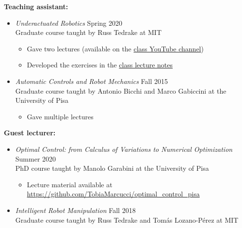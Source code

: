 \documentclass[11pt,a4paper,sans]{moderncv}
\begin{document}
\textbf{Teaching assistant:}

\vspace{5pt}

\begin{itemize}

\item \textit{Underactuated  Robotics} \hfill Spring 2020 \\
Graduate course taught by Russ Tedrake at MIT
\begin{itemize}
\item
Gave two lectures (available on the  \href{https://www.youtube.com/playlist?list=PLkx8KyIQkMfX1WpWYqtep7TOmboZeDtev}{\color{cyan}class YouTube channel})
\item
Developed the exercises in the \href{http://underactuated.csail.mit.edu}{\color{cyan}class lecture notes}
\end{itemize}

\item \textit{Automatic Controls and Robot Mechanics} \hfill Fall 2015 \\
Graduate course taught by Antonio Bicchi and Marco Gabiccini at the University of Pisa
\begin{itemize}
\item
Gave multiple lectures
\end{itemize}

\end{itemize}

\vspace{5pt}

\textbf{Guest lecturer:}

\vspace{5pt}

\begin{itemize}

\item \textit{Optimal Control: from Calculus of Variations to Numerical Optimization} \hfill Summer 2020 \\
PhD course taught by Manolo Garabini at the University of Pisa
\begin{itemize}
\item
Lecture material available at \href{https://github.com/TobiaMarcucci/optimal_control_pisa}{\color{cyan}https://github.com/TobiaMarcucci/optimal\_control\_pisa}
\end{itemize}

\item \textit{Intelligent Robot Manipulation} \hfill Fall 2018 \\
Graduate course taught by Russ Tedrake and Tom\'{a}s Lozano-P\'{e}rez at MIT

\end{itemize}
\end{document}
